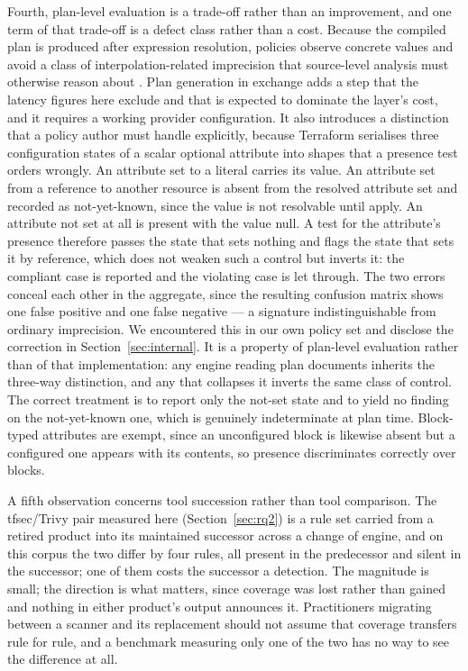\documentclass[smallextended]{svjour3}
\begin{document}
Fourth, plan-level evaluation is a trade-off rather than an improvement, and one
term of that trade-off is a defect class rather than a cost. Because the compiled
plan is produced after expression resolution, policies observe concrete values
and avoid a class of interpolation-related imprecision that source-level analysis
must otherwise reason about \citep{opdebeeck2023control}. Plan generation in
exchange adds a step that the latency figures here exclude and that is expected
to dominate the layer's cost, and it requires a working provider configuration. It also introduces a distinction that a policy author must handle
explicitly, because Terraform serialises three configuration states of a scalar
optional attribute into shapes that a presence test orders wrongly. An attribute
set to a literal carries its value. An attribute set from a reference to another
resource is absent from the resolved attribute set and recorded as not-yet-known,
since the value is not resolvable until apply. An attribute not set at all is
present with the value null. A test for the attribute's presence therefore passes
the state that sets nothing and flags the state that sets it by reference, which
does not weaken such a control but inverts it: the compliant case is reported and
the violating case is let through. The two errors conceal each other in the
aggregate, since the resulting confusion matrix shows one false positive and one
false negative --- a signature indistinguishable from ordinary imprecision. We
encountered this in our own policy set and disclose the correction in
Section~\ref{sec:internal}. It is a property of plan-level evaluation rather than
of that implementation: any engine reading plan documents inherits the three-way
distinction, and any that collapses it inverts the same class of control. The
correct treatment is to report only the not-set state and to yield no finding on
the not-yet-known one, which is genuinely indeterminate at plan time. Block-typed
attributes are exempt, since an unconfigured block is likewise absent but a
configured one appears with its contents, so presence discriminates correctly
over blocks.

A fifth observation concerns tool succession rather than tool comparison. The
tfsec/Trivy pair measured here (Section~\ref{sec:rq2}) is a rule set carried from
a retired product into its maintained successor across a change of engine, and on
this corpus the two differ by four rules, all present in the predecessor and
silent in the successor; one of them costs the successor a detection. The magnitude is small; the direction is
what matters, since coverage was lost rather than gained and nothing in either
product's output announces it. Practitioners migrating between a scanner and its
replacement should not assume that coverage transfers rule for rule, and a
benchmark measuring only one of the two has no way to see the difference at all.
\end{document}
